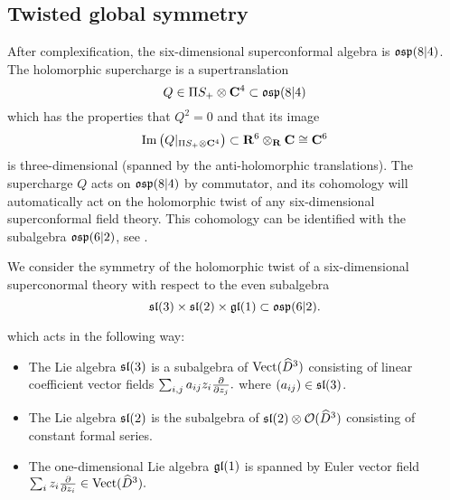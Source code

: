 \documentclass[11pt]{amsart}
\begin{document}
\subsection{Twisted global symmetry}


% 

After complexification, the six-dimensional superconformal algebra is $\mathfrak{osp}(8|4)$. 
The holomorphic supercharge is a supertranslation 
\[
Q \in \Pi S_+ \otimes \mathbf{C}^4 \subset \mathfrak{osp}(8|4)
\]
which has the properties that $Q^2 = 0$ and that its image
\[
{\rm Im}\left(Q|_{\Pi S_+ \otimes \mathbf{C}^4} \right) \subset \mathbf{R}^6 \otimes_{\mathbf{R}} \mathbf{C} \cong \mathbf{C}^6
\]
is three-dimensional (spanned by the anti-holomorphic translations). 
The supercharge $Q$ acts on $\mathfrak{osp}(8|4)$ by commutator, and its cohomology will automatically act on the holomorphic twist of any six-dimensional superconformal field theory. 
This cohomology can be identified with the subalgebra $\mathfrak{osp}(6|2)$, see \cite{SWe36}. 

We consider the symmetry of the holomorphic twist of a six-dimensional superconormal theory with respect to the even subalgebra 
\[
\mathfrak{sl}(3) \times \mathfrak{sl}(2) \times \mathfrak{gl}(1) \subset \mathfrak{osp}(6|2) .
\]


which acts in the following way: 
\begin{itemize}
\item The Lie algebra $\mathfrak{sl}(3)$ is a subalgebra of $\operatorname{Vect}(\widehat{D}^3)$ consisting of linear coefficient vector fields $\sum_{i,j} a_{ij} z_i \frac{\partial}{\partial z_j}.$
where $(a_{ij}) \in \mathfrak{sl}(3)$. 
\item The Lie algebra $\mathfrak{sl}(2)$ is the subalgebra of $\mathfrak{sl}(2) \otimes \mathcal O(\widehat{D}^3)$ consisting of constant formal series. 
\item The one-dimensional Lie algebra $\mathfrak{gl}(1)$ is spanned by Euler vector field $\sum_i z_i \frac{\partial}{\partial z_i} \in \operatorname{Vect}(\widehat{D}^3).$
\end{itemize}
\end{document}
